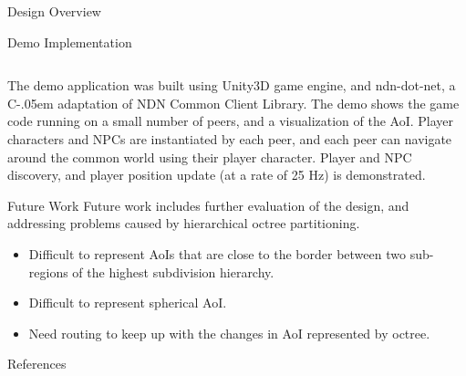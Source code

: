 \documentclass[final,hyperref={pdfpagelabels=false},20pt]{beamer}
\newcommand{\Csharp}{%
  {\settoheight{\dimen0}{C}C\kern-.05em \resizebox{!}{\dimen0}{\raisebox{\depth}{\#}}}}
\begin{document}
\begin{frame}[t]
\begin{columns}[t]
\begin{column}{.465\textwidth}
\begin{block}{Design Overview}
\end{block}


\begin{block}{Demo Implementation}

\begin{column}{.01\textwidth}
\end{column}

The demo application was built using Unity3D game engine, and ndn-dot-net, a \Csharp{} adaptation of NDN Common Client Library. The demo shows the game code running on a small number of peers, and a visualization of the AoI. \newline
Player characters and NPCs are instantiated by each peer, and each peer can navigate around the common world using their player character. Player and NPC discovery, and player position update (at a rate of 25 Hz) is demonstrated.
\newline
\end{block}


\begin{block}{Future Work}
Future work includes further evaluation of the design, and addressing problems caused by hierarchical octree partitioning.
\begin{itemize}
\item Difficult to represent AoIs that are close to the border between two sub-regions of the highest subdivision hierarchy.
\item Difficult to represent spherical AoI.
\item Need routing to keep up with the changes in AoI represented by octree.
\end{itemize}
\end{block}


\begin{block}{References}
        

\end{block}
\end{column}
\end{columns}
\end{frame}
\end{document}
